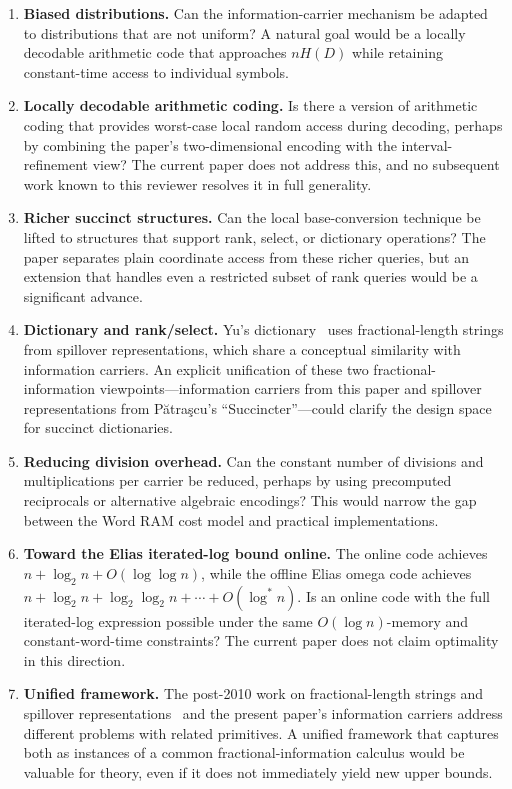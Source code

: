 \begin{enumerate}[label=(\arabic*)]

\item \textbf{Biased distributions.}
  Can the information-carrier mechanism be adapted to distributions that are
  not uniform?  A natural goal would be a locally decodable arithmetic code
  that approaches $nH(D)$ while retaining constant-time access to individual
  symbols.

\item \textbf{Locally decodable arithmetic coding.}
  Is there a version of arithmetic coding that provides worst-case local
  random access during decoding, perhaps by combining the paper's
  two-dimensional encoding with the interval-refinement view?  The current
  paper does not address this, and no subsequent work known to this reviewer
  resolves it in full generality.

\item \textbf{Richer succinct structures.}
  Can the local base-conversion technique be lifted to structures that
  support rank, select, or dictionary operations?  The paper separates plain
  coordinate access from these richer queries, but an extension that handles
  even a restricted subset of rank queries would be a significant advance.

\item \textbf{Dictionary and rank/select.}
  Yu's dictionary~\cite{yu2022dictionary} uses fractional-length strings
  from spillover representations, which share a conceptual similarity with
  information carriers.  An explicit unification of these two
  fractional-information viewpoints---information carriers from this paper and
  spillover representations from P\u{a}tra\c{s}cu's ``Succincter''---could
  clarify the design space for succinct dictionaries.

\item \textbf{Reducing division overhead.}
  Can the constant number of divisions and multiplications per carrier be
  reduced, perhaps by using precomputed reciprocals or alternative algebraic
  encodings?  This would narrow the gap between the Word RAM cost model and
  practical implementations.

\item \textbf{Toward the Elias iterated-log bound online.}
  The online code achieves $n+\log_2n+O(\log\log n)$, while the offline
  Elias omega code achieves $n+\log_2n+\log_2\log_2n+\cdots+O(\log^*n)$.
  Is an online code with the full iterated-log expression possible under the
  same $O(\log n)$-memory and constant-word-time constraints?  The current
  paper does not claim optimality in this direction.

\item \textbf{Unified framework.}
  The post-2010 work on fractional-length strings and spillover
  representations~\cite{yu2022dictionary} and the present paper's information
  carriers address different problems with related primitives.  A unified
  framework that captures both as instances of a common fractional-information
  calculus would be valuable for theory, even if it does not immediately yield
  new upper bounds.

\end{enumerate}
